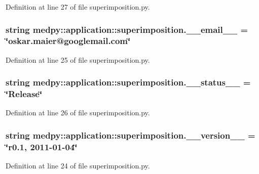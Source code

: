 Definition at line 27 of file superimposition.py.

\hypertarget{namespacemedpy_1_1application_1_1superimposition_aaa1767ee709107508b4c5795c70a58d1}{
\subsubsection[{\_\-\_\-email\_\-\_\-}]{\setlength{\rightskip}{0pt plus 5cm}string {\bf medpy::application::superimposition.\_\-\_\-email\_\-\_\-} = \char`\"{}oskar.maier@googlemail.com\char`\"{}}}
\label{namespacemedpy_1_1application_1_1superimposition_aaa1767ee709107508b4c5795c70a58d1}


Definition at line 25 of file superimposition.py.

\hypertarget{namespacemedpy_1_1application_1_1superimposition_a595c6def65b72f431dc9eea63293d5ae}{
\subsubsection[{\_\-\_\-status\_\-\_\-}]{\setlength{\rightskip}{0pt plus 5cm}string {\bf medpy::application::superimposition.\_\-\_\-status\_\-\_\-} = \char`\"{}Release\char`\"{}}}
\label{namespacemedpy_1_1application_1_1superimposition_a595c6def65b72f431dc9eea63293d5ae}


Definition at line 26 of file superimposition.py.

\hypertarget{namespacemedpy_1_1application_1_1superimposition_a291231d83ce38f1c37f24065032fced0}{
\subsubsection[{\_\-\_\-version\_\-\_\-}]{\setlength{\rightskip}{0pt plus 5cm}string {\bf medpy::application::superimposition.\_\-\_\-version\_\-\_\-} = \char`\"{}r0.1, 2011-\/01-\/04\char`\"{}}}
\label{namespacemedpy_1_1application_1_1superimposition_a291231d83ce38f1c37f24065032fced0}


Definition at line 24 of file superimposition.py.

